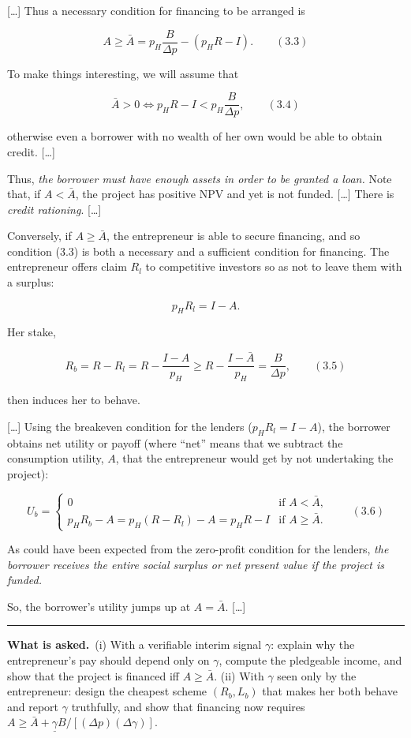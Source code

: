 \documentclass[11pt,a4paper]{article}
\newcommand{\asked}{\par\medskip\noindent\textbf{What is asked.}~}
\newcommand{\stmtend}{\par\endgroup\nopagebreak\noindent\rule{\linewidth}{0.4pt}\par\medskip}
\begin{document}
{[}\ldots{]} Thus a necessary condition for financing to be arranged is

\[A \geqslant \bar A = p_H \frac{B}{\Delta p} - (p_H R - I). \qquad (3.3)\]

To make things interesting, we will assume that

\[\bar A > 0 \iff p_H R - I < p_H \frac{B}{\Delta p}, \qquad (3.4)\]

otherwise even a borrower with no wealth of her own would be able to obtain credit. {[}\ldots{]}

Thus, \emph{the borrower must have enough assets in order to be granted a loan.} Note that, if
\(A < \bar A\), the project has positive NPV and yet is not funded. {[}\ldots{]} There is
\emph{credit rationing}. {[}\ldots{]}

Conversely, if \(A \geqslant \bar A\), the entrepreneur is able to secure financing, and so
condition (3.3) is both a necessary and a sufficient condition for financing. The entrepreneur
offers claim \(R_l\) to competitive investors so as not to leave them with a surplus:

\[p_H R_l = I - A.\]

Her stake,

\[R_b = R - R_l = R - \frac{I - A}{p_H} \geqslant R - \frac{I - \bar A}{p_H} = \frac{B}{\Delta p}, \qquad (3.5)\]

then induces her to behave.

{[}\ldots{]} Using the breakeven condition for the lenders (\(p_H R_l = I - A\)), the borrower
obtains net utility or payoff (where ``net'' means that we subtract the consumption utility, \(A\),
that the entrepreneur would get by not undertaking the project):

\[U_b = \begin{cases} 0 & \text{if } A < \bar A, \\ p_H R_b - A = p_H(R - R_l) - A = p_H R - I & \text{if } A \geqslant \bar A. \end{cases} \qquad (3.6)\]

As could have been expected from the zero-profit condition for the lenders, \emph{the borrower
receives the entire social surplus or net present value if the project is funded.}

So, the borrower's utility jumps up at \(A = \bar A\). {[}\ldots{]}
\stmtend

\asked (i) With a verifiable interim signal $\gamma$: explain why the entrepreneur's pay should depend
only on $\gamma$, compute the pledgeable income, and show that the project is financed iff $A\ge\bar A$.
(ii) With $\gamma$ seen only by the entrepreneur: design the cheapest scheme $(R_b,L_b)$ that makes her
both behave and report $\gamma$ truthfully, and show that financing now requires
$A\ge\bar A+\underline\gamma B/[(\Delta p)(\Delta\gamma)]$.
\end{document}
